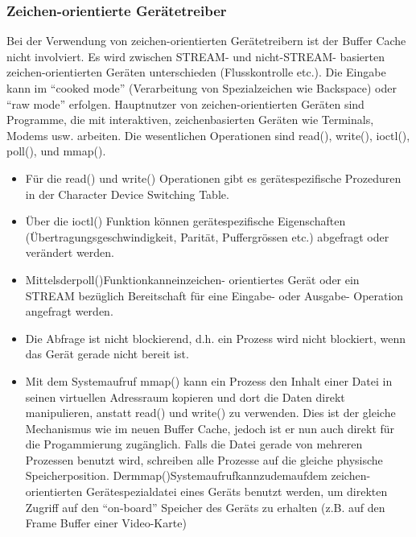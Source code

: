 \documentclass[a4paper, 10pt]{article}
\begin{document}
\subsubsection{Zeichen-orientierte Gerätetreiber}
Bei der Verwendung von zeichen-orientierten Gerätetreibern ist der Buffer Cache nicht involviert. Es wird zwischen STREAM- und nicht-STREAM- basierten zeichen-orientierten Geräten unterschieden (Flusskontrolle etc.). Die Eingabe kann im “cooked mode” (Verarbeitung von Spezialzeichen wie Backspace) oder “raw mode” erfolgen. Hauptnutzer von zeichen-orientierten Geräten sind Programme, die mit interaktiven, zeichenbasierten Geräten wie Terminals, Modems usw. arbeiten. Die wesentlichen Operationen sind read(), write(), ioctl(), poll(), und mmap().
\begin{itemize}
	\item Für die read() und write() Operationen gibt es gerätespezifische Prozeduren in der Character Device Switching Table.
	\item \"Uber die ioctl() Funktion können gerätespezifische Eigenschaften (Übertragungsgeschwindigkeit, Parität, Puffergrössen etc.) abgefragt oder verändert werden.
	\item Mittelsderpoll()Funktionkanneinzeichen- orientiertes Gerät oder ein STREAM bezüglich Bereitschaft für eine Eingabe- oder Ausgabe- Operation angefragt werden.
	\item Die Abfrage ist nicht blockierend, d.h. ein Prozess wird nicht blockiert, wenn das Gerät gerade nicht bereit ist.
	\item Mit dem Systemaufruf mmap() kann ein Prozess den Inhalt einer Datei in seinen virtuellen Adressraum kopieren und dort die Daten direkt manipulieren, anstatt read() und write() zu verwenden. Dies ist der gleiche Mechanismus wie im neuen Buffer Cache, jedoch ist er nun auch direkt für die Progammierung zugänglich. Falls die Datei gerade von mehreren Prozessen benutzt wird, schreiben alle Prozesse auf die gleiche physische Speicherposition. Dermmap()Systemaufrufkannzudemaufdem zeichen-orientierten Gerätespezialdatei eines Geräts benutzt werden, um direkten Zugriff auf den “on-board” Speicher des Geräts zu erhalten (z.B. auf den Frame Buffer einer Video-Karte)
\end{itemize}
\end{document}
